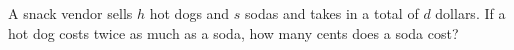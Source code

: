 A snack vendor sells $h$ hot dogs and $s$ sodas and takes in a total of $d$ dollars. If a hot dog costs twice as much as a soda, how many cents does a soda cost?
